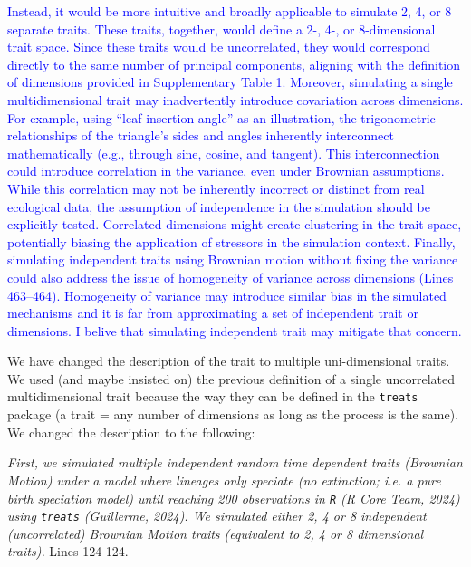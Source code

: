 \documentclass[
]{article}
\begin{document}
\textcolor{blue}{Instead, it would be more intuitive and broadly applicable to simulate 2, 4, or 8 separate traits.
These traits, together, would define a 2-, 4-, or 8-dimensional trait space.
Since these traits would be uncorrelated, they would correspond directly to the same number of principal components, aligning with the definition of dimensions provided in Supplementary Table 1.
Moreover, simulating a single multidimensional trait may inadvertently introduce covariation across dimensions.
For example, using “leaf insertion angle” as an illustration, the trigonometric relationships of the triangle’s sides and angles inherently interconnect mathematically (e.g., through sine, cosine, and tangent).
This interconnection could introduce correlation in the variance, even under Brownian assumptions.
While this correlation may not be inherently incorrect or distinct from real ecological data, the assumption of independence in the simulation should be explicitly tested.
Correlated dimensions might create clustering in the trait space, potentially biasing the application of stressors in the simulation context. 
Finally, simulating independent traits using Brownian motion without fixing the variance could also address the issue of homogeneity of variance across dimensions (Lines 463–464).
Homogeneity of variance may introduce similar bias in the simulated mechanisms and it is far from approximating a set of independent trait or dimensions.
I belive that simulating independent trait may mitigate that concern.}

We have changed the description of the trait to multiple uni-dimensional traits.
We used (and maybe insisted on) the previous definition of a single uncorrelated multidimensional trait because the way they can be defined in the \texttt{treats} package (a trait = any number of dimensions as long as the process is the same).
We changed the description to the following:

\textit{First, we simulated multiple independent random time dependent traits (Brownian Motion) under a model where lineages only speciate (no extinction; i.e. a pure birth speciation model) until reaching 200 observations in \texttt{R} (R Core Team, 2024) using \texttt{treats} (Guillerme, 2024).
We simulated either 2, 4 or 8 independent (uncorrelated) Brownian Motion traits (equivalent to 2, 4 or 8 dimensional traits).} Lines 124-124. %
\end{document}
